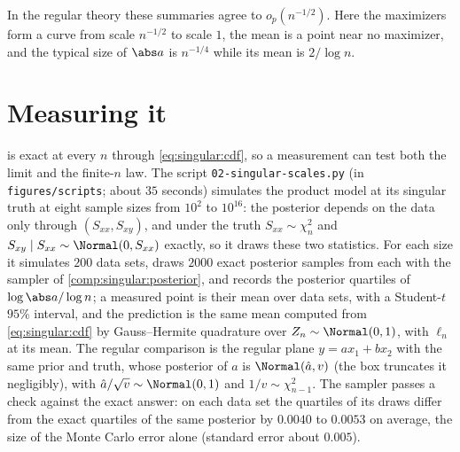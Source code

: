 \begin{refsection}
In the regular theory these summaries agree to $o_p(n^{-1/2})$. Here the maximizers form a curve from scale $n^{-1/2}$ to scale $1$, the mean is a point near no maximizer, and the typical size of $\abs a$ is $n^{-1/4}$ while its mean is $2/\log n$.

\section{Measuring it}\label{sec:singular:measuring}

 is exact at every $n$ through \eqref{eq:singular:cdf}, so a measurement can test both the limit and the finite-$n$ law. The script \texttt{02-singular-scales.py} (in \texttt{figures/scripts}; about $35$ seconds) simulates the product model at its singular truth at eight sample sizes from $10^2$ to $10^{16}$: the posterior depends on the data only through $(S_{xx},S_{xy})$, and under the truth $S_{xx}\sim\chi^2_n$ and $S_{xy}\mid S_{xx}\sim\Normal(0,S_{xx})$ exactly, so it draws these two statistics. For each size it simulates $200$ data sets, draws $2000$ exact posterior samples from each with the sampler of \cref{comp:singular:posterior}, and records the posterior quartiles of $\log\abs a/\log n$; a measured point is their mean over data sets, with a Student-$t$ $95\%$ interval, and the prediction is the same mean computed from \eqref{eq:singular:cdf} by Gauss--Hermite quadrature over $Z_n\sim\Normal(0,1)$, with $\ell_n$ at its mean. The regular comparison is the regular plane $y=ax_1+bx_2$ with the same prior and truth, whose posterior of $a$ is $\Normal(\hat a,v)$ (the box truncates it negligibly), with $\hat a/\sqrt v\sim\Normal(0,1)$ and $1/v\sim\chi^2_{n-1}$. The sampler passes a check against the exact answer: on each data set the quartiles of its draws differ from the exact quartiles of the same posterior by $0.0040$ to $0.0053$ on average, the size of the Monte Carlo error alone (standard error about $0.005$).


\end{refsection}
